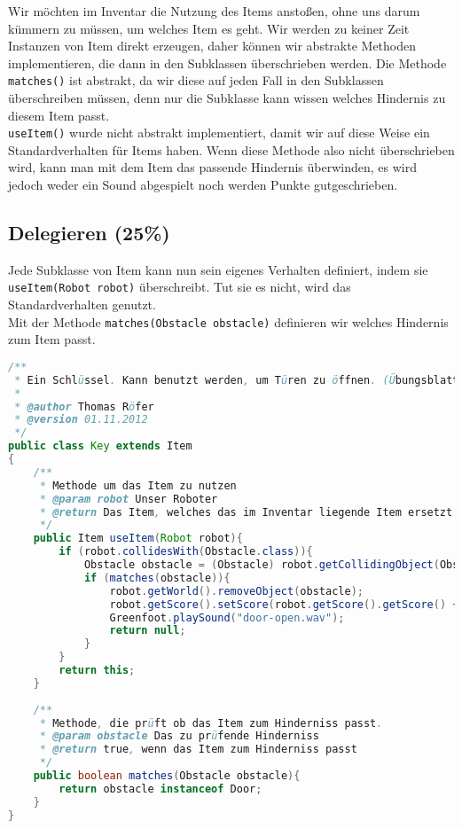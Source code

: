 \documentclass{pi1}
\begin{document}
Wir möchten im Inventar die Nutzung des Items anstoßen, ohne uns darum kümmern zu müssen, um welches Item es geht.
Wir werden zu keiner Zeit Instanzen von Item direkt erzeugen, daher können wir abstrakte Methoden implementieren, die dann in den Subklassen überschrieben werden. Die Methode \texttt{matches()} ist abstrakt, da wir diese auf jeden Fall in den Subklassen überschreiben müssen, denn nur die Subklasse kann wissen welches Hindernis zu diesem Item passt.\\
\texttt{useItem()} wurde nicht abstrakt implementiert, damit wir auf diese Weise ein Standardverhalten für Items haben. Wenn diese Methode also nicht überschrieben wird, kann man mit dem Item das passende Hindernis überwinden, es wird jedoch weder ein Sound abgespielt noch werden Punkte gutgeschrieben.

\subsection{Delegieren (25\%)}

Jede Subklasse von Item kann nun sein eigenes Verhalten definiert, indem sie \texttt{useItem(Robot robot)} überschreibt. Tut sie es nicht, wird das Standardverhalten genutzt.\\
Mit der Methode \texttt{matches(Obstacle obstacle)} definieren wir welches Hindernis zum Item passt.

\begin{lstlisting}[caption={Klasse \emph{Key}}, firstnumber=1, language=Java]
/**
 * Ein Schlüssel. Kann benutzt werden, um Türen zu öffnen. (Übungsblatt 3)
 * 
 * @author Thomas Röfer 
 * @version 01.11.2012
 */
public class Key extends Item
{
    /**
     * Methode um das Item zu nutzen
     * @param robot Unser Roboter
     * @return Das Item, welches das im Inventar liegende Item ersetzt
     */
    public Item useItem(Robot robot){
        if (robot.collidesWith(Obstacle.class)){
            Obstacle obstacle = (Obstacle) robot.getCollidingObject(Obstacle.class);
            if (matches(obstacle)){
                robot.getWorld().removeObject(obstacle);
                robot.getScore().setScore(robot.getScore().getScore() + 100);
                Greenfoot.playSound("door-open.wav");
                return null;
            }
        }
        return this;
    }
    
    /**
     * Methode, die prüft ob das Item zum Hinderniss passt.
     * @param obstacle Das zu prüfende Hinderniss
     * @return true, wenn das Item zum Hinderniss passt
     */
    public boolean matches(Obstacle obstacle){   
        return obstacle instanceof Door;
    }
}
\end{lstlisting}
\end{document}

